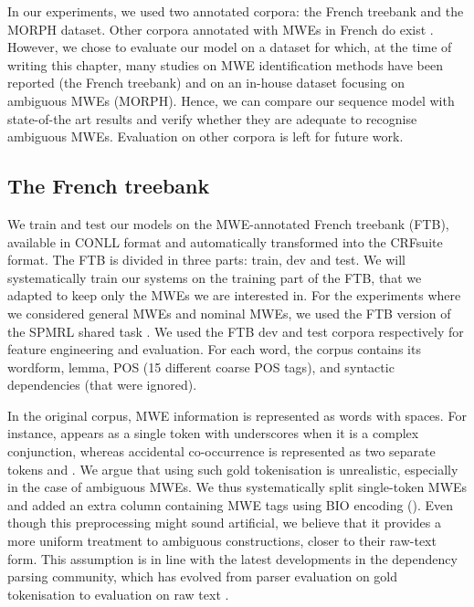 \documentclass[output=paper,
modfonts
]{langscibook}
\begin{document}
In our experiments, we used two annotated corpora: the French treebank and the MORPH dataset. Other corpora annotated with MWEs in French do exist \citep{Laporteetal08a,MWEWorkshop}. However, we chose to evaluate our model on a dataset for which, at the time of writing this chapter, many studies on MWE identification methods have been reported (the French treebank) and on an in-house dataset focusing on ambiguous MWEs (MORPH). Hence, we can compare our sequence model with state-of-the art results and verify whether they are adequate to recognise ambiguous MWEs. Evaluation on other corpora is left for future work.
 
\subsection{The French treebank} 
\label{subsec:ftb}

We train and test our models on the MWE-annotated French treebank (FTB), available in CONLL format and automatically transformed into the CRFsuite format. The FTB is divided in three parts: train, dev and test. We will systematically train our systems on the training part of the FTB, that we adapted to keep only the MWEs we are interested in. For the experiments where we considered general MWEs and nominal MWEs, we used the FTB version of the SPMRL shared task \citep{seddah-EtAl:2013:SPMRL}. We used the FTB dev and test corpora respectively for feature engineering and evaluation.  For each word, the corpus contains its wordform, lemma, POS (15 different coarse POS tags), and syntactic dependencies (that were ignored).

In the original corpus, MWE information is represented as words with spaces. 
For instance,  appears as a single token with underscores when it is a complex conjunction, whereas accidental co-occurrence is represented as two separate tokens  and .
We argue that using such gold tokenisation is unrealistic, especially in the case of ambiguous MWEs.
We thus systematically split single-token MWEs and added an extra column containing MWE tags using BIO encoding ().
Even though this preprocessing might sound artificial, we believe that it provides a more uniform treatment to ambiguous constructions, closer to their raw-text form.
This assumption is in line with the latest developments in the dependency parsing community, which has evolved from parser evaluation on gold tokenisation \citep{Buchholz:2006:CST:1596276.1596305} to evaluation on raw text \citep{zeman-EtAl:2017:K17-3}.
\end{document}
